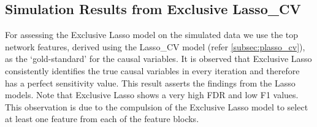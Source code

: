\subsection{Simulation Results from Exclusive Lasso\_CV} \label{subsec:simstudy_exclusvlasso}
For assessing the Exclusive Lasso model on the simulated data we use the top network features, derived using the Lasso\_CV model (refer \autoref{subsec:plasso_cv}), as the \lq gold-standard' for the causal variables. It is observed that Exclusive Lasso consistently identifies the true causal variables in every iteration and therefore has a perfect sensitivity value. This result asserts the findings from the Lasso models. Note that Exclusive Lasso shows a very high FDR and low F1 values. This observation is due to the compulsion of the Exclusive Lasso model to select at least one feature from each of the feature blocks. \\[4pt]
\begin{table}[H]
\caption{Performance measures of Exclusive Lasso model.}
\label{tab:exclusv_lasso_sim_study}
\end{table}